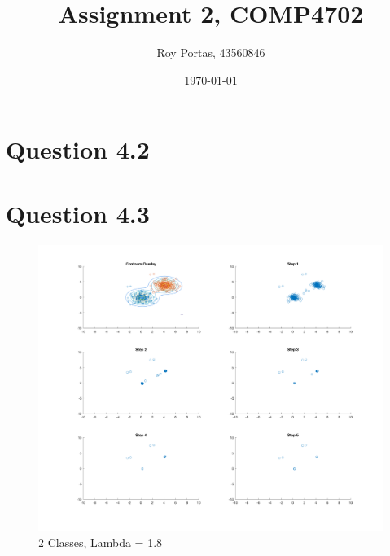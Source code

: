 

\title{Assignment 2, COMP4702}
\author{Roy Portas, 43560846}
\date{\today}



\begin{titlepage}
    \maketitle
\end{titlepage}

\section*{Question 4.2}



\section*{Question 4.3}

\begin{figure}[H]
    \includegraphics[width=\linewidth]{../../pracs/week5/images/q3_2class_1_8}
    \centering
    \caption{2 Classes, Lambda = 1.8}
\end{figure}

